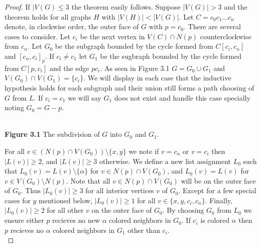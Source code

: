 \documentclass[11pt,letter]{article}
\begin{document}
\begin{proof}
If $|V(G)\le 3$ the theorem easily follows. Suppose $|V(G)|>3$ and the theorem
holds for all graphs $H$ with $|V(H)|<|V(G)|$. Let
$C=c_0c_1\ldots c_n$ denote, in clockwise order, the outer face of $G$ with $p=c_0$.
There are several cases to consider. Let $c_i$ be the next vertex in $V(C)\cap N(p)$ counterclockwise from $c_n$.
Let $G_0$ be the subgraph bounded by the cycle formed from $C[c_i,c_n]$ and $[c_n,c_i]_p$. If $c_i\ne c_1$ let
$G_1$ be the sugbraph bounded by the cycle formed from $C[p,c_i]$ and the edge $pc_i$. As seen in Figure
3.1 $G=G_0\cup G_1$ and $V(G_0)\cap V(G_1)=\{c_i\}$.
We will display in each case that the inductive hypothesis holds for each subgraph and their union still
forms a path choosing of $G$ from $L$.
If $c_i=c_1$ we will say $G_1$ does not exist and handle this case specially noting $G_0=G-p$.

\begin{center}
\hfill\\
\textbf{Figure 3.1} The subdivision of $G$ into $G_0$ and $G_1$.
\end{center}

\noindent For all $v\in (N(p)\cap V(G_0))\setminus\{x,y\}$ we note if $v=c_n$ or $v=c_i$
then $|L(v)|\ge 2$, and $|L(v)|\ge3$ otherwise. We define a new list assignment $L_0$
such that $L_0(v)=L(v)\setminus\{\alpha\}$ for
$v\in N(p)\cap V(G_0)$, and $L_0(v)=L(v)$ for $v\in V(G_0)\setminus N(p)$. Note that all
$v\in N(p)\cap V(G_0)$ will be on the outer face of $G_0$. Thus $|L_0(v)|\ge 3$ for all interior
vertices $v$ of $G_0$. Except for a few special cases for $y$ mentioned below, $|L_0(v)|\ge 1$ for all
$v\in\{x,y,c_i,c_n\}$. Finally, $|L_0(v)|\ge2$ for all other $v$ on the outer face of $G_0$. By choosing $G_0$ from
$L_0$ we ensure either $p$ recieves no new $\alpha$ colored neighbors in $G_0$. If $c_i$ is colored $\alpha$
then $p$ recieves no $\alpha$ colored neighbors in $G_1$ other than $c_i$.\\


\end{proof}
\end{document}
